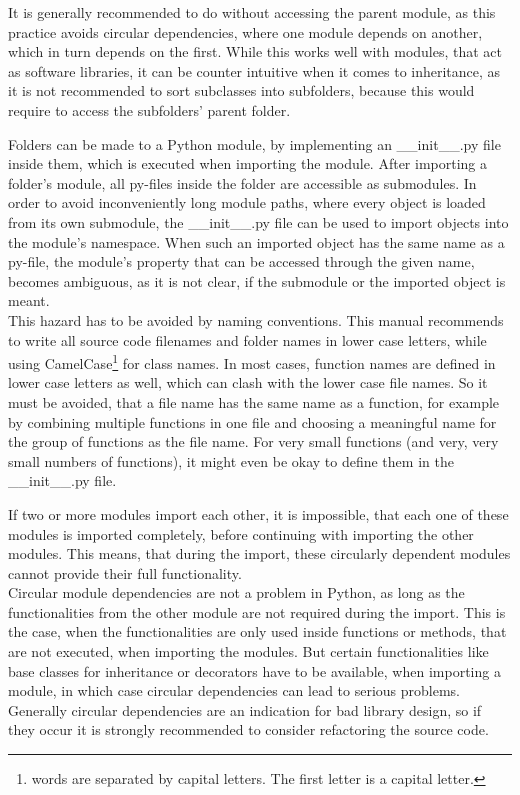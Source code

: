 			It is generally recommended to do without accessing the parent module, as this practice avoids circular dependencies, where one module depends on another, which in turn depends on the first.
			While this works well with modules, that act as software libraries, it can be counter intuitive when it comes to inheritance, as it is not recommended to sort subclasses into subfolders, because this would require to access the subfolders' parent folder.

			Folders can be made to a Python module, by implementing an \_\_init\_\_.py file inside them, which is executed when importing the module.
			After importing a folder's module, all py-files inside the folder are accessible as submodules.
			In order to avoid inconveniently long module paths, where every object is loaded from its own submodule, the \_\_init\_\_.py file can be used to import objects into the module's namespace.
			When such an imported object has the same name as a py-file, the module's property that can be accessed through the given name, becomes ambiguous, as it is not clear, if the submodule or the imported object is meant.\\
			This hazard has to be avoided by naming conventions.
			This manual recommends to write all source code filenames and folder names in lower case letters, while using CamelCase\footnote{words are separated by capital letters. The first letter is a capital letter.} for class names.
			In most cases, function names are defined in lower case letters as well, which can clash with the lower case file names.
			So it must be avoided, that a file name has the same name as a function, for example by combining multiple functions in one file and choosing a meaningful name for the group of functions as the file name.
			For very small functions (and very, very small numbers of functions), it might even be okay to define them in the \_\_init\_\_.py file.

			If two or more modules import each other, it is impossible, that each one of these modules is imported completely, before continuing with importing the other modules.
			This means, that during the import, these circularly dependent modules cannot provide their full functionality.\\
			Circular module dependencies are not a problem in Python, as long as the functionalities from the other module are not required during the import.
			This is the case, when the functionalities are only used inside functions or methods, that are not executed, when importing the modules.
			But certain functionalities like base classes for inheritance or decorators have to be available, when importing a module, in which case circular dependencies can lead to serious problems.\\
			Generally circular dependencies are an indication for bad library design, so if they occur it is strongly recommended to consider refactoring the source code.

